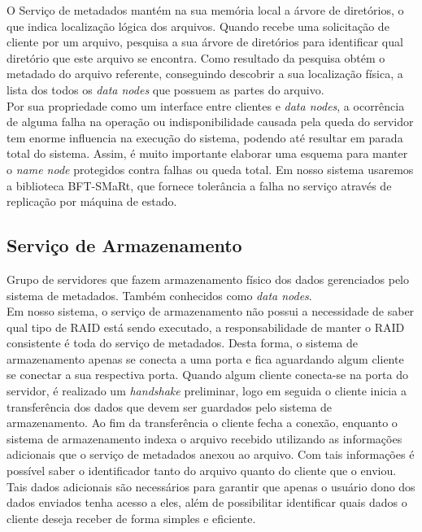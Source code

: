 		O Serviço de metadados mantém na sua memória local a árvore de diretórios, o que indica localização lógica dos arquivos. Quando recebe uma solicitação de cliente por um arquivo, pesquisa a sua árvore de diretórios para identificar qual diretório que este arquivo se encontra. Como resultado da pesquisa obtém o metadado do arquivo referente, conseguindo descobrir a sua localização física, a lista dos todos os \textit{data nodes} que possuem as partes do arquivo.
		\\
		
		Por sua propriedade como um interface entre clientes e \textit{data nodes}, a ocorrência de alguma falha na operação ou indisponibilidade causada pela queda do servidor tem  enorme influencia na execução do sistema, podendo até resultar em parada total do sistema. Assim, é muito importante elaborar uma esquema para manter o \textit{name node} protegidos contra falhas ou queda total. Em nosso sistema usaremos a biblioteca BFT-SMaRt, que fornece tolerância a falha no serviço através de replicação por máquina de estado. \\
	
	\subsection{Serviço de Armazenamento}
		Grupo de servidores que fazem armazenamento físico dos dados gerenciados pelo sistema de metadados. Também conhecidos como \textit{data nodes}.\\
		
		Em nosso sistema, o serviço de armazenamento não possui a necessidade de saber qual tipo de RAID está sendo executado, a responsabilidade de manter o RAID consistente é toda do serviço de metadados. Desta forma, o sistema de armazenamento apenas se conecta a uma porta e fica aguardando algum cliente se conectar a sua respectiva porta. Quando algum cliente conecta-se na porta do servidor, é realizado um \textit{handshake} preliminar, logo em seguida o cliente inicia a transferência dos dados que devem ser guardados pelo sistema de armazenamento. Ao fim da transferência o cliente fecha a conexão, enquanto o sistema de armazenamento indexa o arquivo recebido utilizando as informações adicionais que o serviço de metadados anexou ao arquivo. Com tais informações é possível saber o identificador tanto do arquivo quanto do cliente que o enviou. Tais dados adicionais são necessários para garantir que apenas o usuário dono dos dados enviados tenha acesso a eles, além de possibilitar identificar quais dados o cliente deseja receber de forma simples e eficiente.  
		\\
	
